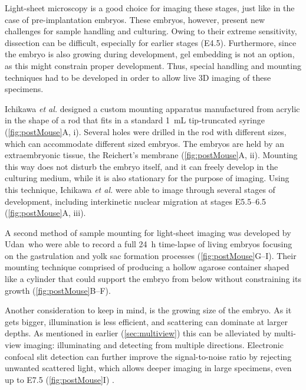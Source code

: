     Light-sheet microscopy is a good choice for imaging these stages, just like in the case of pre-implantation embryos. These embryos, however, present new challenges for sample handling and culturing. Owing to their extreme sensitivity, dissection can be difficult, especially for earlier stages (E4.5). Furthermore, since the embryo is also growing during development, gel embedding is not an option, as this might constrain proper development. Thus, special handling and mounting techniques had to be developed in order to allow live 3D imaging of these specimens.

    Ichikawa \textit{et al.} \cite{ichikawa_live_2013} designed a custom mounting apparatus manufactured from acrylic in the shape of a rod that fits in a standard \SI{1}{mL} tip-truncated syringe (\autoref{fig:postMouse}A, i). Several holes were drilled in the rod with different sizes, which can accommodate different sized embryos. The embryos are held by an extraembryonic tissue, the Reichert's membrane (\autoref{fig:postMouse}A, ii). Mounting this way does not disturb the embryo itself, and it can freely develop in the culturing medium, while it is also stationary for the purpose of imaging. Using this technique, Ichikawa \textit{et al.} were able to image through several stages of development, including interkinetic nuclear migration at stages E5.5--6.5 (\autoref{fig:postMouse}A, iii).

    A second method of sample mounting for light-sheet imaging was developed by Udan~\etal who were able to record a full \SI{24}{h} time-lapse of living embryos focusing on the gastrulation and yolk sac formation processes (\autoref{fig:postMouse}G--I). Their mounting technique comprised of producing a hollow agarose container shaped like a cylinder that could support the embryo from below without constraining its growth (\autoref{fig:postMouse}B--F).

    Another consideration to keep in mind, is the growing size of the embryo. As it gets bigger, illumination is less efficient, and scattering can dominate at larger depths. As mentioned in earlier (\autoref{sec:multiview}) this can be alleviated by multi-view imaging: illuminating and detecting from multiple directions. Electronic confocal slit detection can further improve the signal-to-noise ratio by rejecting unwanted scattered light, which allows deeper imaging in large specimens, even up to E7.5 (\autoref{fig:postMouse}I) \cite{de_medeiros_confocal_2015}.



